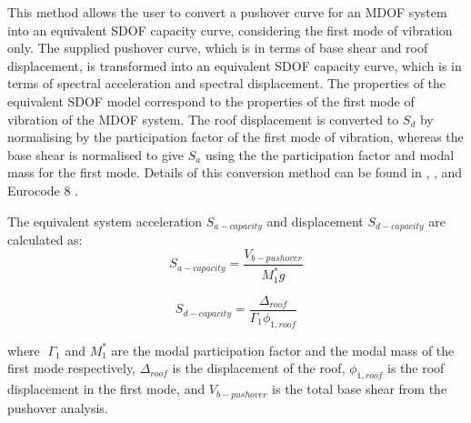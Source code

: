 This method allows the user to convert a pushover curve for an MDOF system into an equivalent SDOF capacity curve, considering the first mode of vibration only. The supplied pushover curve, which is in terms of base shear and roof displacement, is transformed into an equivalent SDOF capacity curve, which is in terms of spectral acceleration and spectral displacement. The properties of the equivalent SDOF model correspond to the properties of the first mode of vibration of the MDOF system. The roof displacement is converted to $S_d$ by normalising by the participation factor of the first mode of vibration, whereas the base shear is normalised to give $S_a$ using the the participation factor and modal mass for the first mode. Details of this conversion method can be found in \citet{ATC1996}, \citet{FEMA4402005}, and Eurocode 8 \citep{CEN2005}.

The equivalent system acceleration $S_{a-capacity}$ and displacement $S_{d-capacity}$ are calculated as:
\begin{equation}
	S_{a-capacity} = \frac{V_{b-pushover}}{M_{1}^{*} g}
\end{equation}

\begin{equation}
	S_{d-capacity} = \frac{\Delta_{roof}}{\Gamma_{1} \phi_{1, roof}}
\end{equation}

where 􏰁$\Gamma_{1}$ and $M_{1}^{*}$ are the modal participation factor and the modal mass of the first mode respectively, $\Delta_{roof}$ is the displacement of the roof, $\phi_{1, roof}$ is the roof displacement in the first mode, and $V_{b-pushover}$ is the total base shear from the pushover analysis.